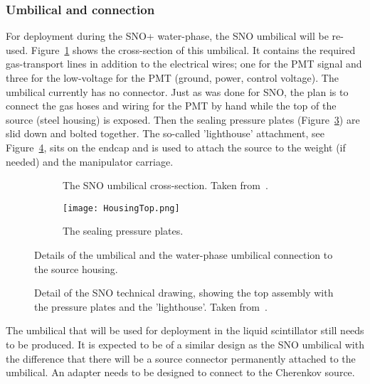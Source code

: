 \subsubsection{Umbilical and connection}
For deployment during the SNO+ water-phase, the SNO \Li umbilical will be re-used. Figure~\ref{fig:sno_umbilical} shows the cross-section of this umbilical. It contains the required gas-transport lines in addition to the electrical wires; one for the PMT signal and three for the low-voltage for the PMT (ground, power, control voltage). The umbilical currently has no connector. Just as was done for SNO, the plan is to connect the gas hoses and wiring for the PMT by hand while the top of the source (steel housing) is exposed. Then the sealing pressure plates (Figure~\ref{fig:pressureplates}) are slid down and bolted together. The so-called 'lighthouse' attachment, see Figure~\ref{fig:connection}, sits on the endcap and is used to attach the source to the weight (if needed) and the manipulator carriage.

\begin{figure}
\begin{subfigure}{.57\textwidth}
\caption{\label{fig:sno_umbilical} The SNO \Li umbilical cross-section. Taken from~\cite{Tagg:2001}.}
\end{subfigure}
\hspace{0.5cm}
\begin{subfigure}{.35\textwidth}
  \texttt{[image: HousingTop.png]}
  \caption{\label{fig:pressureplates} The sealing pressure plates.}
\end{subfigure}
\caption{Details of the umbilical and the water-phase umbilical connection to the source housing.}
\end{figure}

\begin{figure}
\caption{\label{fig:connection}Detail of the SNO \Li technical drawing, showing the top assembly with the pressure plates and the 'lighthouse'. Taken from~\cite{Tagg:2001}.}
\end{figure}

The umbilical that will be used for deployment in the liquid scintillator still needs to be produced. It is expected to be of a similar design as the SNO \Li umbilical with the difference that there will be a source connector permanently attached to the umbilical. An adapter needs to be designed to connect to the Cherenkov source. 
